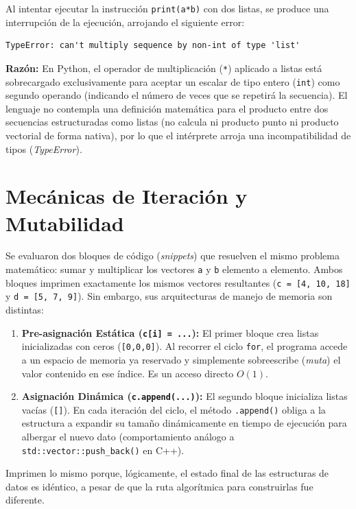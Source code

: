 \documentclass[11pt]{article}
\begin{document}
Al intentar ejecutar la instrucción \texttt{print(a*b)} con dos listas, se produce una interrupción de la ejecución, arrojando el siguiente error:
\begin{verbatim}
TypeError: can't multiply sequence by non-int of type 'list'
\end{verbatim}

\textbf{Razón:} En Python, el operador de multiplicación (\texttt{*}) aplicado a listas está sobrecargado exclusivamente para aceptar un escalar de tipo entero (\texttt{int}) como segundo operando (indicando el número de veces que se repetirá la secuencia). El lenguaje no contempla una definición matemática para el producto entre dos secuencias estructuradas como listas (no calcula ni producto punto ni producto vectorial de forma nativa), por lo que el intérprete arroja una incompatibilidad de tipos (\textit{TypeError}).

\section{Mecánicas de Iteración y Mutabilidad}

Se evaluaron dos bloques de código (\textit{snippets}) que resuelven el mismo problema matemático: sumar y multiplicar los vectores \texttt{a} y \texttt{b} elemento a elemento. Ambos bloques imprimen exactamente los mismos vectores resultantes (\texttt{c = [4, 10, 18]} y \texttt{d = [5, 7, 9]}). Sin embargo, sus arquitecturas de manejo de memoria son distintas:

\begin{enumerate}
    \item \textbf{Pre-asignación Estática (\texttt{c[i] = ...}):} El primer bloque crea listas inicializadas con ceros (\texttt{[0,0,0]}). Al recorrer el ciclo \texttt{for}, el programa accede a un espacio de memoria ya reservado y simplemente sobreescribe (\textit{muta}) el valor contenido en ese índice. Es un acceso directo $O(1)$.
    
    \item \textbf{Asignación Dinámica (\texttt{c.append(...)}):} El segundo bloque inicializa listas vacías (\texttt{[]}). En cada iteración del ciclo, el método \texttt{.append()} obliga a la estructura a expandir su tamaño dinámicamente en tiempo de ejecución para albergar el nuevo dato (comportamiento análogo a \texttt{std::vector::push\_back()} en C++).
\end{enumerate}
Imprimen lo mismo porque, lógicamente, el estado final de las estructuras de datos es idéntico, a pesar de que la ruta algorítmica para construirlas fue diferente.
\end{document}
